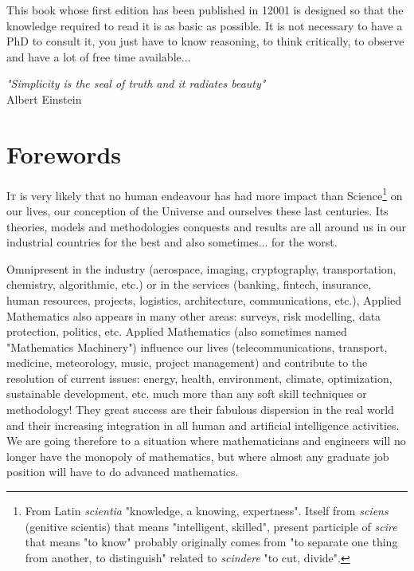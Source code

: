 	\newpage
	\thispagestyle{empty}
	\mbox{}
	This book whose first edition has been published in 12001 is designed so that the knowledge required to read it is as basic as possible. It is not necessary to have a PhD to consult it, you just have to know reasoning, to think critically, to observe and have a lot of free time available...
	\begin{flushright}
	\textit{"Simplicity is the seal of truth and it radiates beauty"} \\
	 Albert Einstein
	\end{flushright}
	
	\section{Forewords}
	\lettrine[lines=4]{\color{BrickRed}I}{t} is very likely that no human endeavour has had more impact than Science\footnote{From Latin \textit{scientia} "knowledge, a knowing, expertness". Itself from \textit{sciens} (genitive scientis) that means "intelligent, skilled", present participle of \textit{scire} that means "to know" probably originally comes from "to separate one thing from another, to distinguish" related to \textit{scindere} "to cut, divide".} on our lives, our conception of the Universe and ourselves these last centuries. Its theories, models and methodologies conquests and results are all around us in our industrial countries for the best and also sometimes... for the worst.

	Omnipresent in the industry (aerospace, imaging, cryptography, transportation, chemistry, algorithmic, etc.) or in the services (banking, fintech, insurance, human resources, projects, logistics, architecture, communications, etc.), Applied Mathematics also appears in many other areas: surveys, risk modelling, data protection, politics, etc.  Applied Mathematics (also sometimes named "Mathematics Machinery") influence our lives (telecommunications, transport, medicine, meteorology, music, project management) and contribute to the resolution of current issues: energy, health, environment, climate, optimization, sustainable development, etc. much more than any soft skill techniques or methodology! They great success are their fabulous dispersion in the real world and their increasing integration in all human and artificial intelligence activities. We are going therefore to a situation where mathematicians and engineers will no longer have the monopoly of mathematics, but where almost any graduate job position will have to do advanced mathematics.


